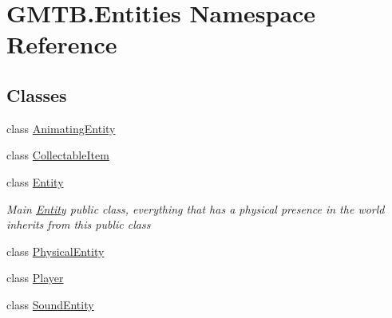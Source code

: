 \hypertarget{namespace_g_m_t_b_1_1_entities}{}\section{G\+M\+T\+B.\+Entities Namespace Reference}
\label{namespace_g_m_t_b_1_1_entities}
\subsection*{Classes}
\begin{DoxyCompactItemize}
\item 
class \mbox{\hyperlink{class_g_m_t_b_1_1_entities_1_1_animating_entity}{Animating\+Entity}}
\item 
class \mbox{\hyperlink{class_g_m_t_b_1_1_entities_1_1_collectable_item}{Collectable\+Item}}
\item 
class \mbox{\hyperlink{class_g_m_t_b_1_1_entities_1_1_entity}{Entity}}
\begin{DoxyCompactList}\small\item\em Main \mbox{\hyperlink{class_g_m_t_b_1_1_entities_1_1_entity}{Entity}} public class, everything that has a physical presence in the world inherits from this public class \end{DoxyCompactList}\item 
class \mbox{\hyperlink{class_g_m_t_b_1_1_entities_1_1_physical_entity}{Physical\+Entity}}
\item 
class \mbox{\hyperlink{class_g_m_t_b_1_1_entities_1_1_player}{Player}}
\item 
class \mbox{\hyperlink{class_g_m_t_b_1_1_entities_1_1_sound_entity}{Sound\+Entity}}
\end{DoxyCompactItemize}

